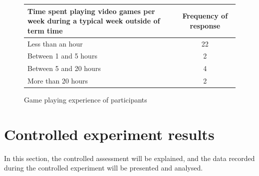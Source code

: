 \documentclass[12pt,a4paper,twoside,openright]{report}
\begin{document}
\begin{figure}[tbh]
\begin{center}
\begin{tabular}{ |p{8cm}|c| }
  \hline
Time spent playing video games per week during a typical week outside of term time & Frequency of response \\ \hline \hline
Less than an hour      & 22 \\ \hline
Between 1 and 5 hours  & 2  \\ \hline
Between 5 and 20 hours & 4  \\ \hline
More than 20 hours     & 2  \\ \hline
\end{tabular}
\end{center}
\caption{Game playing experience of participants}
\label{gamesExperienceTable}
\end{figure}



\section{Controlled experiment results}
\label{controlled experiment results}


In this section, the controlled assessment will be explained, and the data recorded during the controlled experiment will be presented and analysed.
\end{document}
